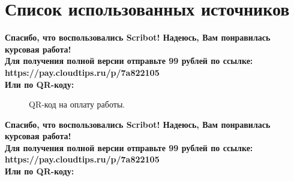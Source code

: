 \documentclass{article}
\begin{document}
\section{Список использованных источников}
\begin{center}
    \textbf{
        Спасибо, что воспользовались Scribot! Надеюсь, Вам понравилась курсовая работа!\\
        Для получения полной версии отправьте 99 рублей по ссылке:\\
        https://pay.cloudtips.ru/p/7a822105\\
        Или по QR-коду:\\
    }
\end{center}
\begin{figure}[h]
    \caption{QR-код на оплату работы.}
    \label{ris:image}
\end{figure}
\newpage
\begin{center}
    \textbf{
        Спасибо, что воспользовались Scribot! Надеюсь, Вам понравилась курсовая работа!\\
        Для получения полной версии отправьте 99 рублей по ссылке:\\
        https://pay.cloudtips.ru/p/7a822105\\
        Или по QR-коду:\\
    }
\end{center}
\end{document}
